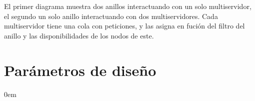 \documentclass{article}
\begin{document}
\begin{flushleft}
			\hspace*{-1cm}
			
			El primer diagrama muestra dos anillos interactuando con un solo multiservidor, el segundo un solo anillo interactuando con dos multiservidores. Cada multiservidor tiene una cola con peticiones, y las asigna en fución del filtro del anillo y las disponibilidades de los nodos de este. 
	\section{Parámetros de diseño}
	\begin{description}
		\addtolength{\itemindent}{0.5cm}
		\itemsep0em 
		

\end{description}
\end{flushleft}
\end{document}
